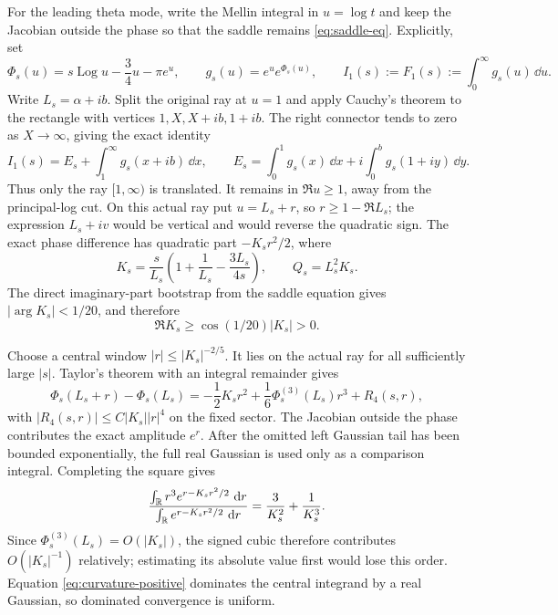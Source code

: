 \documentclass[12pt]{article}
\begin{document}
For the leading theta mode, write the Mellin integral in $u=\log t$ and keep
the Jacobian outside the phase so that the saddle remains
\eqref{eq:saddle-eq}.  Explicitly, set
\[
 \Phi_s(u)=s\operatorname{Log}u-\frac34u-\pi e^u,
 \qquad g_s(u)=e^u e^{\Phi_s(u)},
 \qquad I_1(s):=F_1(s):=\int_0^\infty g_s(u)\,\dd u.
\]
Write $L_s=\alpha+ib$.  Split the original ray at
$u=1$ and apply Cauchy's theorem to the rectangle with vertices
$1,X,X+ib,1+ib$.  The right connector tends to zero as $X\to\infty$, giving
the exact identity
\[
 I_1(s)=E_s+\int_1^\infty g_s(x+ib)\,\dd x,
 \qquad
 E_s=\int_0^1g_s(x)\,\dd x+i\int_0^b g_s(1+iy)\,\dd y.
\]
Thus only the ray $[1,\infty)$ is translated.  It remains in $\Re u\ge1$,
away from the principal-log cut.  On this actual ray put $u=L_s+r$, so
$r\ge1-\Re L_s$; the expression $L_s+iv$ would be vertical and would
reverse the quadratic sign.  The exact phase difference has quadratic part
$-K_sr^2/2$, where
\begin{equation}\label{eq:curvature}
 K_s=\frac{s}{L_s}\left(1+\frac1{L_s}-\frac{3L_s}{4s}\right),
 \qquad Q_s=L_s^2K_s.
\end{equation}
The direct imaginary-part bootstrap from the saddle equation gives
$|\arg K_s|<1/20$, and therefore
\begin{equation}\label{eq:curvature-positive}
 \Re K_s\ge\cos(1/20)|K_s|>0.
\end{equation}

Choose a central window $|r|\le |K_s|^{-2/5}$.  It lies on the actual ray for
all sufficiently large $|s|$.  Taylor's theorem with an integral remainder
gives
\[
 \Phi_s(L_s+r)-\Phi_s(L_s)
 =-\frac12K_sr^2+\frac16\Phi_s^{(3)}(L_s)r^3+R_4(s,r),
\]
with $|R_4(s,r)|\le C|K_s||r|^4$ on the fixed sector.  The Jacobian
outside the phase contributes the exact amplitude $e^r$.  After the omitted
left Gaussian tail has been bounded exponentially, the full real Gaussian is
used only as a comparison integral.  Completing the square gives
\[
 \frac{\int_{\mathbb R}r^3e^{r-K_sr^2/2}\,\,\mathrm d r}
 {\int_{\mathbb R}e^{r-K_sr^2/2}\,\,\mathrm d r}
 =\frac3{K_s^2}+\frac1{K_s^3}.
\]
Since $\Phi_s^{(3)}(L_s)=O(|K_s|)$, the signed cubic therefore contributes
$O(|K_s|^{-1})$ relatively; estimating its absolute value first would lose
this order.  Equation
\eqref{eq:curvature-positive} dominates the central integrand by a real
Gaussian, so dominated convergence is uniform.
\end{document}
